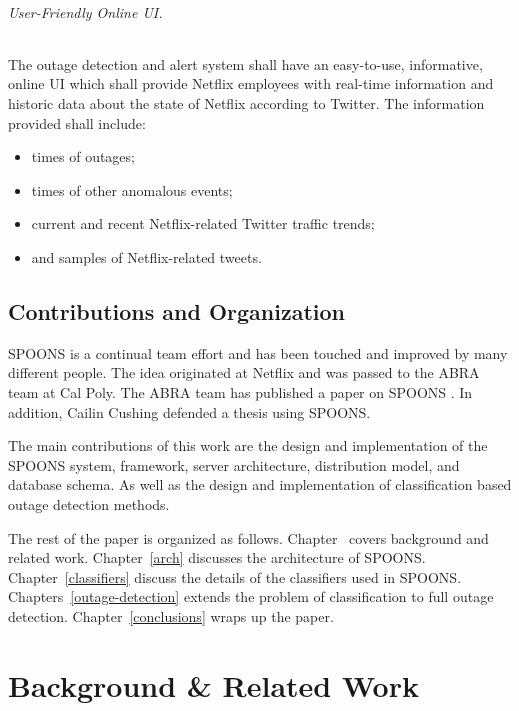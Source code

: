 \documentclass[12pt]{ucthesis}
\begin{document}
\paragraph{User-Friendly Online UI.}
The outage detection and alert system shall have an easy-to-use, informative,
online UI which shall provide Netflix employees with real-time information and
historic data about the state of Netflix according to Twitter. The information
provided shall include:

\begin{itemize}
   \item times of outages;
   \item times of other anomalous events;
   \item current and recent Netflix-related Twitter traffic trends;
   \item and samples of Netflix-related tweets.
\end{itemize}

\chapter{Contributions and Organization}
\label{contributions-organization}

SPOONS is a continual team effort and has been touched and improved by many different people.
The idea originated at Netflix and was passed to the ABRA team at Cal Poly. The ABRA team has published a paper
on SPOONS \cite{abraPaper}. In addition, Cailin Cushing defended a thesis using SPOONS\cite{cailinThesis}.

The main contributions of this work are the design and implementation of the SPOONS system, framework, server architecture,
distribution model, and database schema. As well as the design and implementation of classification based outage detection
methods.

The rest of the paper is organized as follows. Chapter~\ref{background-related-work} covers background and related work.
Chapter~\ref{arch} discusses the architecture of SPOONS. Chapter~\ref{classifiers} discuss the details of the classifiers
used in SPOONS. Chapters~\ref{outage-detection} extends the problem of classification to full outage detection. Chapter~\ref{conclusions} wraps up the paper.

\part{Background \& Related Work}
\label{background-related-work}
\end{document}
